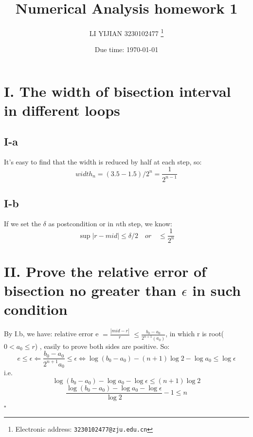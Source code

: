 \documentclass[a4paper]{article}
\begin{document}
\title{Numerical Analysis homework 1}

\author{LI YIJIAN 3230102477
  \thanks{Electronic address: \texttt{3230102477@zju.edu.cn}}}


\date{Due time: \today}

\maketitle


\section*{I. The width of bisection interval in different loops}

\subsection*{I-a}

It's easy to find that the width is reduced by half at each step, so:
\[
width_n = (3.5-1.5)/2^n = \frac{1}{2^{n-1}}
\]

\subsection*{I-b}
If we set the $\delta$ as postcondition or in $n$th step, we know:
\[
\sup|r - mid| \leqslant \delta/2 \quad or \quad \leqslant \frac{1}{2^n} 
\]
\section*{II. Prove the relative error of bisection no greater than $\epsilon$ in such condition}

By I.b, we have: relative error e $= \frac{|mid - r|}{r}$ $ \leqslant \frac{b_0 - a_0}{2^{n+1}(a_0)}$, in which r is root($0 < a_0 \leqslant r$)
, easily to prove both sides are positive.
So:
\[
e \leqslant \epsilon \Leftarrow \frac{b_0 - a_0}{2^{n+1}a_0} \leqslant \epsilon \iff \log(b_0 - a_0) - (n + 1)\log 2 - \log a_0 \leqslant \log \epsilon
\]
i.e.
\[
 \log(b_0 - a_0) - \log a_0 - \log \epsilon \leqslant (n + 1) \log2
\]
\[
\frac{ \log(b_0 - a_0) - \log a_0 - \log \epsilon }{\log2} - 1\leqslant n 
\]
\hfill$\square$
\end{document}
